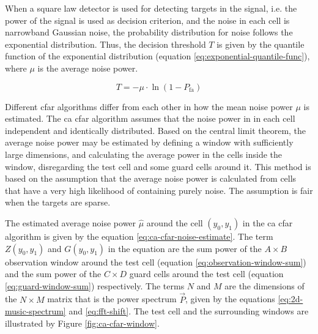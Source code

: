 When a square law detector is used for detecting targets in the signal,
i.e. the power of the signal is used as decision criterion,
and the noise in each cell is narrowband Gaussian noise,
the probability distribution for noise follows the exponential distribution.
Thus, the decision threshold $T$ is given by the quantile function of the exponential distribution (equation \ref{eq:exponential-quantile-func}),
where $\mu$ is the average noise power. \cite{mean-level-detection}

\begin{equation}
    \label{eq:exponential-quantile-func}
    T = -\mu \cdot \ln( 1-P_{\mathrm{fa}} )
\end{equation}

Different \gls{cfar} algorithms differ from each other in how the mean noise power $\mu$ is estimated.
The \gls{ca} \gls{cfar} algorithm assumes that the noise power in in each cell independent and identically distributed.
Based on the central limit theorem, the average noise power may be estimated by defining a window with sufficiently large dimensions,
and calculating the average power in the cells inside the window, disregarding the test cell and some guard cells around it.
This method is based on the assumption that the average noise power is calculated from cells that have a very high likelihood of containing purely noise.
The assumption is fair when the targets are sparse.

The estimated average noise power $\hat \mu$ around the cell $(y_0, y_1)$
in the \gls{ca} \gls{cfar} algorithm is given by the equation \ref{eq:ca-cfar-noise-estimate}.
The term $Z(y_0, y_1)$ and $G(y_0, y_1)$ in the equation are the sum power of the $A \times B$
observation window around the test cell (equation \ref{eq:observation-window-sum})
and the sum power of the $C \times D$ guard cells around the test cell
(equation \ref{eq:guard-window-sum}) respectively.
The terms $N$ and $M$ are the dimensions of the $N \times M$ matrix that is the power spectrum $\vec{P}$,
given by the equations \ref{eq:2d-music-spectrum} and \ref{eq:fft-shift}. \cite{fast-two-dimensional-cfar}
The test cell and the surrounding windows are illustrated by Figure \ref{fig:ca-cfar-window}.

